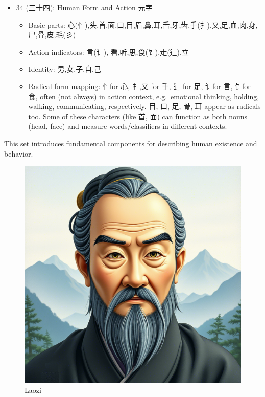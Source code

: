 \begin{itemize}
\tightlist
\item
  34 (三十四): Human Form and Action 元字

  \begin{itemize}
  \tightlist
  \item
    Basic parts:
    心(忄),头,首,面,口,目,眉,鼻,耳,舌,牙,齿,手(扌),又,足,血,肉,身,尸,骨,皮,毛(彡)
  \item
    Action indicators: 言(讠), 看,听,思,食(饣),走(辶),立
  \item
    Identity: 男,女,子,自,己
  \item
    Radical form mapping: 忄for 心, 扌,又 for 手, 辶 for 足, 讠for 言,
    饣for 食, often (not always) in action context, e.g.~emotional
    thinking, holding, walking, communicating, respectively. 目, 口, 足,
    骨, 耳 appear as radicals too. Some of these characters (like 首,
    面) can function as both nouns (head, face) and measure
    words/classifiers in different contexts.
  \end{itemize}
\end{itemize}

This set introduces fundamental components for describing human
existence and behavior.

\begin{figure}
\centering
\includegraphics{./images/laozi-qwen-max.png}
\caption{Laozi}
\end{figure}

